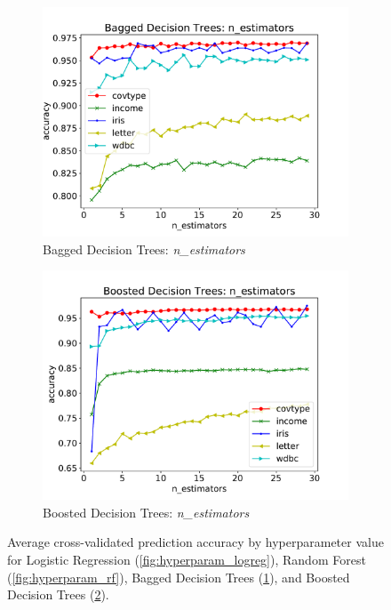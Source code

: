\documentclass[twoside,11pt]{article}
\begin{document}
\begin{figure}[h]
				\begin{subfigure}[b]{.49\linewidth}
					\includegraphics[width=\linewidth]{bagdt_hyperparam}
					\caption{Bagged Decision Trees: \textit{n\_estimators}}
					\label{fig:hyperparam_bagdt}
				\end{subfigure}
				\begin{subfigure}[b]{.49\linewidth}
					\includegraphics[width=\linewidth]{bstdt_hyperparam}
					\caption{Boosted Decision Trees: \textit{n\_estimators}}
					\label{fig:hyperparam_bstdt}
				\end{subfigure}
				
				\caption{Average cross-validated prediction accuracy by hyperparameter value for Logistic Regression (\ref{fig:hyperparam_logreg}), Random Forest (\ref{fig:hyperparam_rf}), Bagged Decision Trees (\ref{fig:hyperparam_bagdt}), and Boosted Decision Trees (\ref{fig:hyperparam_bstdt}).}
				\label{fig:hyperparam_others}
			\end{figure}
		
\end{document}

